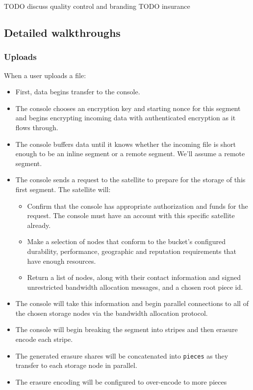 \documentclass[a4paper,10pt]{article} \usepackage[utf8]{inputenc}
\newcommand{\x}[1]{{\tt #1}} \newcommand{\code}[1]{{\tt #1}}
\newcommand{\todo}[1]{{\color{red} TODO #1 }}
\begin{document}
\todo{discuss quality control and branding}
\todo{insurance}

\subsection{Detailed walkthroughs}

\subsubsection{Uploads}

When a user uploads a file:

\begin{itemize}
\item First, data begins transfer to the console.
\item The console chooses an encryption key and starting nonce for
  this segment and begins encrypting incoming data with authenticated
  encryption as it flows through.
\item The console buffers data until it knows whether the incoming file is
short enough to be an inline segment or a remote segment. We'll assume a remote
segment.
\item The console sends a request to the satellite to prepare for the storage
of this first segment. The satellite will:
  \begin{itemize}
  \item Confirm that the console has appropriate authorization and funds for
    the request. The console must have an account with this 
specific satellite already.
  \item Make a selection of nodes that conform to the bucket's configured
    durability, performance, geographic and reputation requirements that have
    enough resources.
  \item Return a list of nodes, along with their contact information and
    signed unrestricted bandwidth allocation messages, and a chosen root piece
    id.
  \end{itemize}
\item The console will take this information and begin parallel connections to
  all of the chosen storage nodes via the bandwidth allocation protocol.
\item The console will begin breaking the segment into stripes and then
  erasure encode each stripe.
\item The generated erasure shares will be concatenated into \x{pieces} as they
  transfer to each storage node in parallel.
\item The erasure encoding will be configured to over-encode to more pieces

\end{itemize}
\end{document}
